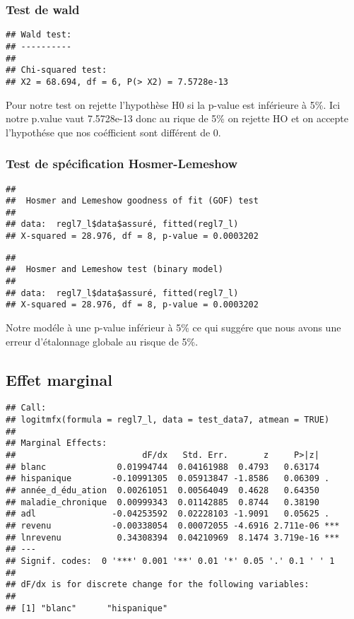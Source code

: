 \documentclass[
  14pt,
  french,
]{article}
\begin{document}
\hypertarget{test-de-wald}{%
\subsubsection{Test de wald}\label{test-de-wald}}

\begin{verbatim}
## Wald test:
## ----------
## 
## Chi-squared test:
## X2 = 68.694, df = 6, P(> X2) = 7.5728e-13
\end{verbatim}

Pour notre test on rejette l'hypothèse H0 si la p-value est inférieure à
5\%. \linebreak Ici notre p.value vaut 7.5728e-13 donc au rique de 5\%
on rejette HO et on accepte l'hypothése que nos coéfficient sont
différent de 0.

\hypertarget{test-de-spuxe9cification-hosmer-lemeshow}{%
\subsubsection{Test de spécification
Hosmer-Lemeshow}\label{test-de-spuxe9cification-hosmer-lemeshow}}

\begin{verbatim}
## 
##  Hosmer and Lemeshow goodness of fit (GOF) test
## 
## data:  regl7_l$data$assuré, fitted(regl7_l)
## X-squared = 28.976, df = 8, p-value = 0.0003202
\end{verbatim}

\begin{verbatim}
## 
##  Hosmer and Lemeshow test (binary model)
## 
## data:  regl7_l$data$assuré, fitted(regl7_l)
## X-squared = 28.976, df = 8, p-value = 0.0003202
\end{verbatim}

Notre modéle à une p-value inférieur à 5\% ce qui suggére que nous avons
une erreur d'étalonnage globale au risque de 5\%.

\hypertarget{effet-marginal}{%
\subsection{Effet marginal}\label{effet-marginal}}

\begin{verbatim}
## Call:
## logitmfx(formula = regl7_l, data = test_data7, atmean = TRUE)
## 
## Marginal Effects:
##                         dF/dx   Std. Err.       z     P>|z|    
## blanc              0.01994744  0.04161988  0.4793   0.63174    
## hispanique        -0.10991305  0.05913847 -1.8586   0.06309 .  
## année_d_édu_ation  0.00261051  0.00564049  0.4628   0.64350    
## maladie_chronique  0.00999343  0.01142885  0.8744   0.38190    
## adl               -0.04253592  0.02228103 -1.9091   0.05625 .  
## revenu            -0.00338054  0.00072055 -4.6916 2.711e-06 ***
## lnrevenu           0.34308394  0.04210969  8.1474 3.719e-16 ***
## ---
## Signif. codes:  0 '***' 0.001 '**' 0.01 '*' 0.05 '.' 0.1 ' ' 1
## 
## dF/dx is for discrete change for the following variables:
## 
## [1] "blanc"      "hispanique"
\end{verbatim}
\end{document}
